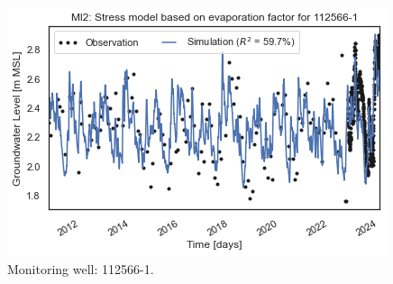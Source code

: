 \begin{figure}[htbp]
\begin{minipage}{0.32\textwidth}
        \includegraphics[width=\linewidth]{frontmatter/Rozenburg-fig/1125661.png}
        \caption{Monitoring well: 112566-1.}
        \label{fig:112566-1}
    \end{minipage}
\end{figure}

